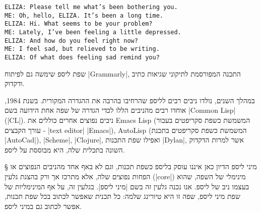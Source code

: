 \begin{minipage}\textwidth
\begin{LTR}
  \scriptsize
  \begin{verbatim}
ELIZA: Please tell me what’s been bothering you.
ME: Oh, hello, ELIZA. It’s been a long time.
ELIZA: Hi. What seems to be your problem?
ME: Lately, I’ve been feeling a little depressed.
ELIZA: And how do you feel right now?
ME: I feel sad, but relieved to be writing.
ELIZA: Of what does feeling sad remind you?
\end{verbatim}
\end{LTR}
\end{minipage}
שפת ליספ שימשה גם לפיתוח
\E|Grammarly|, התכנה המפורסמת לתיקוני שגיאות כתיב ודקדוק.

במהלך השנים, נולדו ניבים רבים לליספ שהרחיבו בהרבה את ההגדרה המקורית. בשנת 1984,
אוחדו רבים מהניבים
הללו לכדי הגדרה של שפה אחת הידועה בשם \E|Common Lisp| (\E|CL|). ניבים נפוצים
אחרים כוללים את Emacs Lisp (המשמשת כשפת סקריפטים בעבור עורך הקבצים - \E|text
editor| \E|Emacs|), AutoLisp (המשמשת כשפת סקריפטים בתכנת \E|AutoCad|),
\E|Scheme|, \E|Clojure|, ואפילו שפת התכנות \E|Dylan|, אשר למרות הדקדוק השונה
בתכלית שלה, היא מבוססת על ליספ.

§ מיני ליספ
הדיון כאן איננו עוסק בליספ כשפת תכנות, וגם לא באף אחד מהניבים הנפוצים או הפחות
נפוצים שלה, אלא מתרכז אך ורק בהצגת גלעין (\E|core|) מינימלי של השפה, שהוא בעצמו
ניב של ליספ. אנו נכנה גלעין זה בשם \ע|מיני ליספ|. בגלעין זה,
על אף המינימליות של שפת מיני ליספ,
שפה זו היא טיורינג שלמה: כל תכנית שאפשר לכתוב בכל שפת תכנות, אפשר לכתוב גם
במיני ליספ.

